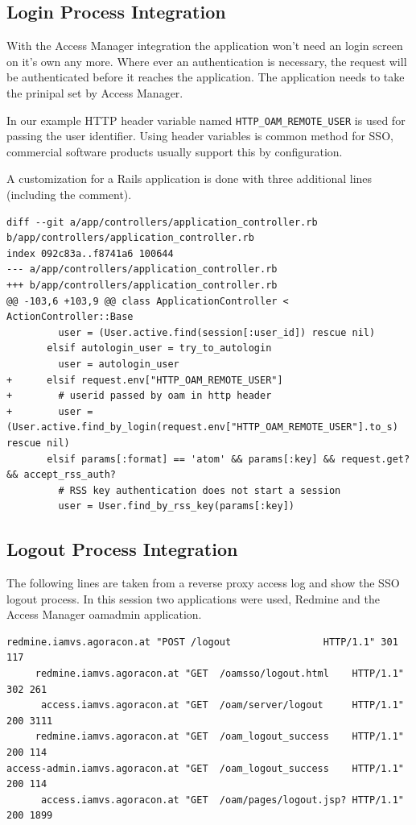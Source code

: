 \documentclass[11pt]{report}
\begin{document}
\subsection{Login Process Integration}

With the Access Manager integration the application won't need an login screen
on it's own any more.  Where ever an authentication is necessary, the request
will be authenticated before it reaches the application.  The application needs
to take the prinipal set by Access Manager.

In our example HTTP header variable named \verb|HTTP_OAM_REMOTE_USER| is used
for passing the user identifier.  Using header variables is common method for
SSO, commercial software products usually support this by configuration.

A customization for a Rails application is done with three additional lines
(including the comment).


\begin{Verbatim}[label=Changes for Login]
diff --git a/app/controllers/application_controller.rb b/app/controllers/application_controller.rb
index 092c83a..f8741a6 100644
--- a/app/controllers/application_controller.rb
+++ b/app/controllers/application_controller.rb
@@ -103,6 +103,9 @@ class ApplicationController < ActionController::Base
         user = (User.active.find(session[:user_id]) rescue nil)
       elsif autologin_user = try_to_autologin
         user = autologin_user
+      elsif request.env["HTTP_OAM_REMOTE_USER"]
+        # userid passed by oam in http header
+        user = (User.active.find_by_login(request.env["HTTP_OAM_REMOTE_USER"].to_s) rescue nil)
       elsif params[:format] == 'atom' && params[:key] && request.get? && accept_rss_auth?
         # RSS key authentication does not start a session
         user = User.find_by_rss_key(params[:key])
\end{Verbatim}



\subsection{Logout Process Integration}

The following lines are taken from a reverse proxy access log and show the SSO
logout process.  In this session two applications were used, Redmine and the
Access Manager oamadmin application.


\begin{Verbatim}[label=HTTP Calls during Logout]
     redmine.iamvs.agoracon.at "POST /logout                HTTP/1.1" 301 117
     redmine.iamvs.agoracon.at "GET  /oamsso/logout.html    HTTP/1.1" 302 261
      access.iamvs.agoracon.at "GET  /oam/server/logout     HTTP/1.1" 200 3111
     redmine.iamvs.agoracon.at "GET  /oam_logout_success    HTTP/1.1" 200 114
access-admin.iamvs.agoracon.at "GET  /oam_logout_success    HTTP/1.1" 200 114
      access.iamvs.agoracon.at "GET  /oam/pages/logout.jsp? HTTP/1.1" 200 1899
\end{Verbatim}
\end{document}
